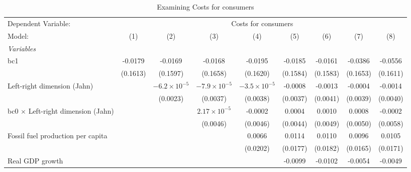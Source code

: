 
\begin{table}[htbp]
   \caption{Examining Costs for consumers}
   \centering
   \begin{tabular}{lcccccccc}
      \tabularnewline \midrule \midrule
      Dependent Variable: & \multicolumn{8}{c}{Costs for consumers}\\
      Model:                                    & (1)      & (2)                   & (3)                   & (4)                   & (5)      & (6)      & (7)      & (8)\\  
      \midrule
      \emph{Variables}\\
      bc1                                       & -0.0179  & -0.0169               & -0.0168               & -0.0195               & -0.0185  & -0.0161  & -0.0386  & -0.0556\\   
                                                & (0.1613) & (0.1597)              & (0.1658)              & (0.1620)              & (0.1584) & (0.1583) & (0.1653) & (0.1611)\\   
      Left-right dimension (Jahn)               &          & $-6.2\times 10^{-5}$  & $-7.9\times 10^{-5}$  & $-3.5\times 10^{-5}$  & -0.0008  & -0.0013  & -0.0004  & -0.0014\\   
                                                &          & (0.0023)              & (0.0037)              & (0.0038)              & (0.0037) & (0.0041) & (0.0039) & (0.0040)\\   
      bc0 $\times$ Left-right dimension (Jahn)  &          &                       & $2.17\times 10^{-5}$  & -0.0002               & 0.0004   & 0.0010   & 0.0008   & -0.0002\\   
                                                &          &                       & (0.0046)              & (0.0046)              & (0.0044) & (0.0049) & (0.0050) & (0.0058)\\   
      Fossil fuel production per capita         &          &                       &                       & 0.0066                & 0.0114   & 0.0110   & 0.0096   & 0.0105\\   
                                                &          &                       &                       & (0.0202)              & (0.0177) & (0.0182) & (0.0165) & (0.0171)\\   
      Real GDP growth                           &          &                       &                       &                       & -0.0099  & -0.0102  & -0.0054  & -0.0049\\   

\end{tabular}
\end{table}

